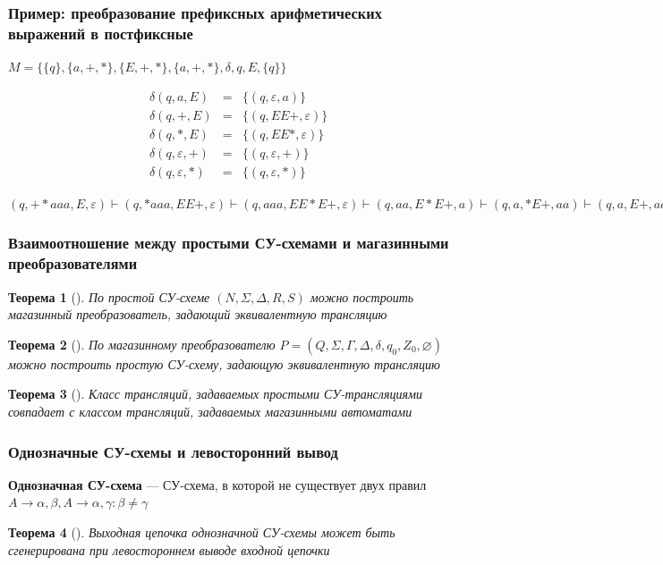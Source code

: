 \documentclass{beamer}
\newtheorem{rutheorem}{Теорема}
\begin{document}
\begin{frame}[fragile]
  \transwipe[direction=90]
  \frametitle{Пример: преобразование префиксных арифметических выражений в постфиксные}
$M = \{ \{ q \}, \{ a, +, * \}, \{ E, +, * \}, \{ a, +, * \}, \delta, q, E, \{ q \} \}$



$$
\begin{array}{crcl}
&\delta(q, a, E)& = & \{ (q, \varepsilon, a) \} \\
&\delta(q, +, E)& = & \{ (q, EE+, \varepsilon) \} \\
&\delta(q, *, E)& = & \{ (q, EE*, \varepsilon) \} \\
&\delta(q, \varepsilon, +)& = & \{ (q, \varepsilon, +) \} \\
&\delta(q, \varepsilon, *)& = & \{ (q, \varepsilon, *) \}
\end{array}
$$

$(q, +*aaa, E, \varepsilon) \vdash (q, *aaa, EE+, \varepsilon) \vdash (q, aaa, EE*E+, \varepsilon) \vdash (q, aa, E*E+, a) \vdash (q, a, *E+, aa) \vdash (q, a, E+, aa*) \vdash (q, \varepsilon, +, aa*a) \vdash (q, \varepsilon, \varepsilon, aa*a+)$
\end{frame}

\begin{frame}[fragile]
  \transwipe[direction=90]
  \frametitle{Взаимоотношение между простыми СУ-схемами и магазинными преобразователями}
  \begin{rutheorem}[]
  	По простой СУ-схеме $( N, \Sigma, \Delta, R, S )$  можно построить магазинный преобразователь, задающий эквивалентную трансляцию
  \end{rutheorem}
  
  \begin{rutheorem}[]
    По магазинному преобразователю $P = (Q, \Sigma, \Gamma, \Delta, \delta, q_0, Z_0, \varnothing) $ можно построить простую СУ-схему, задающую эквивалентную трансляцию
  \end{rutheorem}

  \begin{rutheorem}[]
    Класс трансляций, задаваемых простыми СУ-трансляциями совпадает с классом трансляций, задаваемых магазинными автоматами
  \end{rutheorem}
\end{frame}


\begin{frame}[fragile]
  \transwipe[direction=90]
  \frametitle{Однозначные СУ-схемы и левосторонний вывод}
\textbf{Однозначная СУ-схема} --- СУ-схема, в которой не существует двух правил $A \rightarrow \alpha, \beta, A \rightarrow \alpha, \gamma: \beta \neq \gamma$  
  
\begin{rutheorem}[]
Выходная цепочка однозначной СУ-схемы может быть сгенерирована при левостороннем выводе входной цепочки
\end{rutheorem}

\end{frame}
\end{document}
